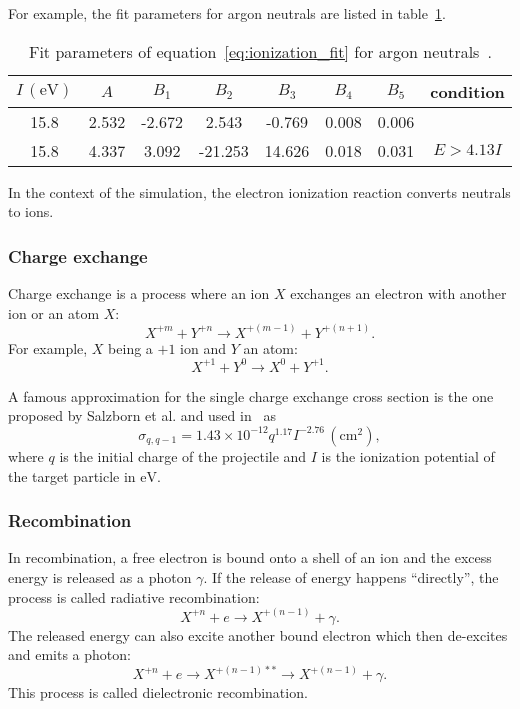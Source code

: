 \documentclass[a4paper,twoside,12pt]{article}
\begin{document}
For example, the fit parameters for argon neutrals are listed in table~\ref{table:argon_ionization}.
\begin{table}
    \centering
    \caption{Fit parameters of equation~\ref{eq:ionization_fit} for argon neutrals~\cite{recommended_ionization}.}
    \label{table:argon_ionization}
    \begin{tabular}{cccccccc}
        \toprule
        $I\,(\si{\electronvolt})$ & $A$ & $B_1$ & $B_2$ & $B_3$ & $B_4$ & $B_5$ & condition\\
        \midrule
        15.8 & 2.532 & -2.672 & 2.543 & -0.769 & 0.008 & 0.006 & \\
        15.8 & 4.337 & 3.092 & -21.253 & 14.626 & 0.018 & 0.031 & $E > 4.13I$ \\
        \bottomrule
    \end{tabular}
\end{table}

In the context of the simulation, the electron ionization reaction converts neutrals to ions.

\subsubsection{Charge exchange}
Charge exchange is a process where an ion $X$ exchanges an electron with another ion or an atom $X$:
\[
    X^{+m} + Y^{+n} \rightarrow X^{+(m-1)} + Y^{+(n+1)}.
\]
For example, $X$ being a $+1$ ion and $Y$ an atom:
\[
    X^{+1} + Y^0 \rightarrow X^{0} + Y^{+1}.
\]

A famous approximation for the single charge exchange cross section is the one proposed by Salzborn et al. and used in~\cite{cex} as
\begin{equation}
    \label{eq:cex}
    \sigma_{q, q-1} = 1.43 \times 10^{-12} q^{1.17} I^{-2.76}\,(\si{\centi\metre\squared}),
\end{equation}
where $q$ is the initial charge of the projectile and $I$ is the ionization potential of the target particle in $\si{\electronvolt}$.

\subsubsection{Recombination}
In recombination, a free electron is bound onto a shell of an ion and the excess energy is released as a photon $\gamma$. If the release of energy happens ``directly'', the process is called radiative recombination:
\[
    X^{+n} + e \rightarrow X^{+(n-1)} + \gamma.
\]
The released energy can also excite another bound electron which then de-excites and emits a photon:
\[
    X^{+n} + e \rightarrow X^{+(n-1)**} \rightarrow X^{+(n-1)} + \gamma.
\]
This process is called dielectronic recombination.~\cite{nist:recombination}
\end{document}
